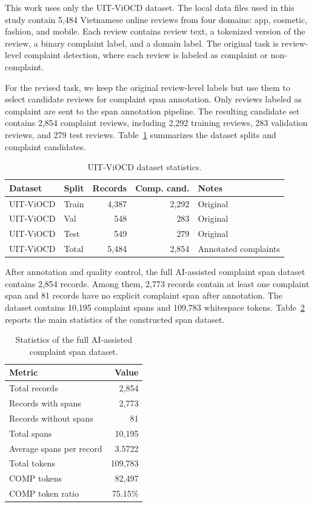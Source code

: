 \documentclass[11pt]{article}
\begin{document}
This work uses only the UIT-ViOCD dataset. The local data files used in this study contain 5,484 Vietnamese online reviews from four domains: app, cosmetic, fashion, and mobile. Each review contains review text, a tokenized version of the review, a binary complaint label, and a domain label. The original task is review-level complaint detection, where each review is labeled as complaint or non-complaint.

For the revised task, we keep the original review-level labels but use them to select candidate reviews for complaint span annotation. Only reviews labeled as complaint are sent to the span annotation pipeline. The resulting candidate set contains 2,854 complaint reviews, including 2,292 training reviews, 283 validation reviews, and 279 test reviews. Table~\ref{tab:dataset-statistics} summarizes the dataset splits and complaint candidates.

\begin{table}[t]
\centering
\small
\begin{tabular}{llrrp{1.3cm}}
\toprule
Dataset & Split & Records & Comp. cand. & Notes \\
\midrule
UIT-ViOCD & Train & 4,387 & 2,292 & Original \\
UIT-ViOCD & Val & 548 & 283 & Original \\
UIT-ViOCD & Test & 549 & 279 & Original \\
\midrule
UIT-ViOCD & Total & 5,484 & 2,854 & Annotated complaints \\
\bottomrule
\end{tabular}
\caption{UIT-ViOCD dataset statistics.}
\label{tab:dataset-statistics}
\end{table}

After annotation and quality control, the full AI-assisted complaint span dataset contains 2,854 records. Among them, 2,773 records contain at least one complaint span and 81 records have no explicit complaint span after annotation. The dataset contains 10,195 complaint spans and 109,783 whitespace tokens. Table~\ref{tab:span-dataset-statistics} reports the main statistics of the constructed span dataset.

\begin{table}[t]
\centering
\small
\begin{tabular}{lr}
\toprule
Metric & Value \\
\midrule
Total records & 2,854 \\
Records with spans & 2,773 \\
Records without spans & 81 \\
Total spans & 10,195 \\
Average spans per record & 3.5722 \\
Total tokens & 109,783 \\
COMP tokens & 82,497 \\
COMP token ratio & 75.15\% \\
\bottomrule
\end{tabular}
\caption{Statistics of the full AI-assisted complaint span dataset.}
\label{tab:span-dataset-statistics}
\end{table}
\end{document}
